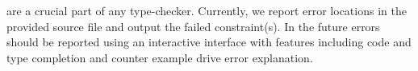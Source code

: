  are a crucial part of any type-checker.
Currently, we report error locations in the provided source
file and output the failed constraint(s). 
% 
In the future errors should be reported using an
interactive interface with features including 
code and type completion and counter example drive
error explanation. 





